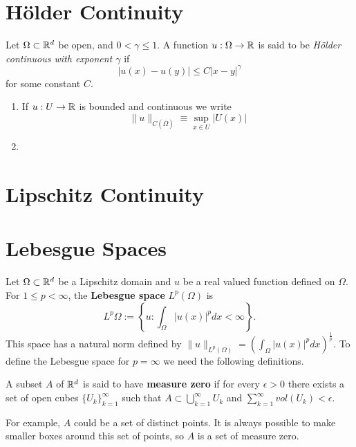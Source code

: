 \section{H\"older Continuity} 
Let $\Omega \subset \mathbb{R}^d$ be open, and $0<\gamma \leq 1$. A function $u:\Omega \rightarrow \mathbb{R}$ is said to be \textit{H\"older continuous with exponent $\gamma$} if 
\begin{equation}
| u(x) - u(y) | \leq C |x-y |^{\gamma}
\end{equation}
for some constant $C$. 

\begin{defn}
\begin{enumerate}
\item If $u:U \rightarrow \mathbb{R}$ is bounded and continuous we write 
\[ \| u \|_{C(\overline{\Omega})} \equiv \sup_{x\in U} |U(x) | \]
\item 
\end{enumerate}
\end{defn}

\section{Lipschitz Continuity}

\section{Lebesgue Spaces}
Let $\Omega \subset \mathbb{R}^d$ be a Lipschitz domain and $u$ be a real valued function defined on $\Omega$. For $1\leq p < \infty$, the \textbf{Lebesgue space} $L^p(\Omega)$ is 
\begin{equation}
\label{def:LpSpace}
L^p{\Omega} := \left \lbrace u : \int_{\Omega} |u(x) | ^p dx < \infty \right\rbrace.
\end{equation} 
This space has a natural norm defined by $\| u \|_{L^p(\Omega)}=(\int_{\Omega} |u(x) | ^p dx)^{\frac{1}{p}}$. To define the Lebesgue space for $p=\infty$ we need the following definitions.

\begin{defn}
A subset $A$ of $\mathbb{R}^d$ is said to have \textbf{measure zero} if for every $\epsilon > 0$ there exists a set of open cubes $ \{ U_k \}^{\infty}_{k=1}$ such that $A \subset \bigcup^{\infty}_{k=1} U_k$ and $\sum^{\infty}_{k=1} vol(U_k) < \epsilon$.
\end{defn}

For example, $A$ could be a set of distinct points. It is always possible to make smaller boxes around this set of points, so $A$ is a set of measure zero.

